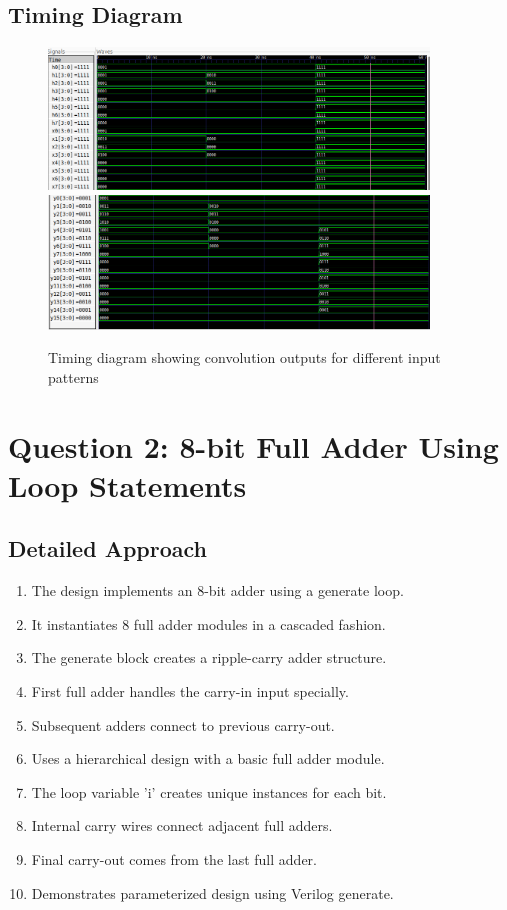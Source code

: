 \documentclass{article}
\begin{document}
\subsection{Timing Diagram}
\begin{figure}[H]
    \centering
    \includegraphics[width=0.9\textwidth]{1.png}
      \includegraphics[width=0.9\textwidth]{2.png}
    \caption{Timing diagram showing convolution outputs for different input patterns}
    \label{fig:conv_timing}
\end{figure}

\section{Question 2: 8-bit Full Adder Using Loop Statements}

\subsection{Detailed Approach}
\begin{enumerate}
    \item The design implements an 8-bit adder using a generate loop.
    \item It instantiates 8 full adder modules in a cascaded fashion.
    \item The generate block creates a ripple-carry adder structure.
    \item First full adder handles the carry-in input specially.
    \item Subsequent adders connect to previous carry-out.
    \item Uses a hierarchical design with a basic full adder module.
    \item The loop variable 'i' creates unique instances for each bit.
    \item Internal carry wires connect adjacent full adders.
    \item Final carry-out comes from the last full adder.
    \item Demonstrates parameterized design using Verilog generate.
\end{enumerate}
\end{document}
